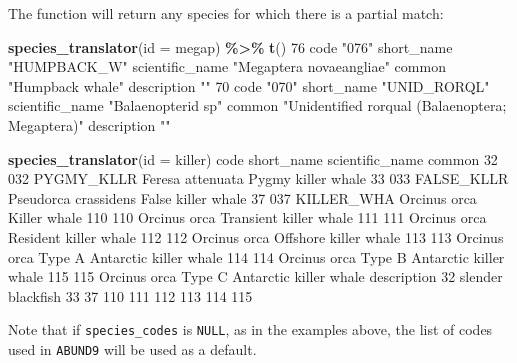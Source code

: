 \documentclass[
]{book}
\newenvironment{Shaded}{\begin{snugshade}}{\end{snugshade}}
\newcommand{\AttributeTok}[1]{\textcolor[rgb]{0.13,0.29,0.53}{#1}}
\newcommand{\DecValTok}[1]{\textcolor[rgb]{0.00,0.00,0.81}{#1}}
\newcommand{\FunctionTok}[1]{\textcolor[rgb]{0.13,0.29,0.53}{\textbf{#1}}}
\newcommand{\NormalTok}[1]{#1}
\newcommand{\SpecialCharTok}[1]{\textcolor[rgb]{0.81,0.36,0.00}{\textbf{#1}}}
\newcommand{\StringTok}[1]{\textcolor[rgb]{0.31,0.60,0.02}{#1}}
\begin{document}
The function will return any species for which there is a partial match:

\begin{Shaded}
\begin{Highlighting}[]
\FunctionTok{species\_translator}\NormalTok{(}\AttributeTok{id =} \StringTok{\textquotesingle{}megap\textquotesingle{}}\NormalTok{) }\SpecialCharTok{\%\textgreater{}\%} \FunctionTok{t}\NormalTok{()}
                \DecValTok{76}                      
\NormalTok{code            }\StringTok{"076"}                   
\NormalTok{short\_name      }\StringTok{"HUMPBACK\_W"}            
\NormalTok{scientific\_name }\StringTok{"Megaptera novaeangliae"}
\NormalTok{common          }\StringTok{"Humpback whale"}        
\NormalTok{description     }\StringTok{""}                      
                \DecValTok{70}                                              
\NormalTok{code            }\StringTok{"070"}                                           
\NormalTok{short\_name      }\StringTok{"UNID\_RORQL"}                                    
\NormalTok{scientific\_name }\StringTok{"Balaenopterid sp"}                              
\NormalTok{common          }\StringTok{"Unidentified rorqual (Balaenoptera; Megaptera)"}
\NormalTok{description     }\StringTok{""}                                              
\end{Highlighting}
\end{Shaded}

\begin{Shaded}
\begin{Highlighting}[]
\FunctionTok{species\_translator}\NormalTok{(}\AttributeTok{id =} \StringTok{\textquotesingle{}killer\textquotesingle{}}\NormalTok{)}
\NormalTok{    code short\_name      scientific\_name                        common}
\DecValTok{32}   \DecValTok{032}\NormalTok{ PYGMY\_KLLR     Feresa attenuata            Pygmy killer whale}
\DecValTok{33}   \DecValTok{033}\NormalTok{ FALSE\_KLLR Pseudorca crassidens            False killer whale}
\DecValTok{37}   \DecValTok{037}\NormalTok{ KILLER\_WHA         Orcinus orca                  Killer whale}
\DecValTok{110}  \DecValTok{110}\NormalTok{                    Orcinus orca        Transient killer whale}
\DecValTok{111}  \DecValTok{111}\NormalTok{                    Orcinus orca         Resident killer whale}
\DecValTok{112}  \DecValTok{112}\NormalTok{                    Orcinus orca         Offshore killer whale}
\DecValTok{113}  \DecValTok{113}\NormalTok{                    Orcinus orca Type A Antarctic killer whale}
\DecValTok{114}  \DecValTok{114}\NormalTok{                    Orcinus orca Type B Antarctic killer whale}
\DecValTok{115}  \DecValTok{115}\NormalTok{                    Orcinus orca Type C Antarctic killer whale}
\NormalTok{          description}
\DecValTok{32}\NormalTok{  slender blackfish}
\DecValTok{33}                   
\DecValTok{37}                   
\DecValTok{110}                  
\DecValTok{111}                  
\DecValTok{112}                  
\DecValTok{113}                  
\DecValTok{114}                  
\DecValTok{115}                  
\end{Highlighting}
\end{Shaded}

Note that if \texttt{species\_codes} is \texttt{NULL}, as in the examples above, the list of codes used in \texttt{ABUND9} will be used as a default.

  
\end{document}
